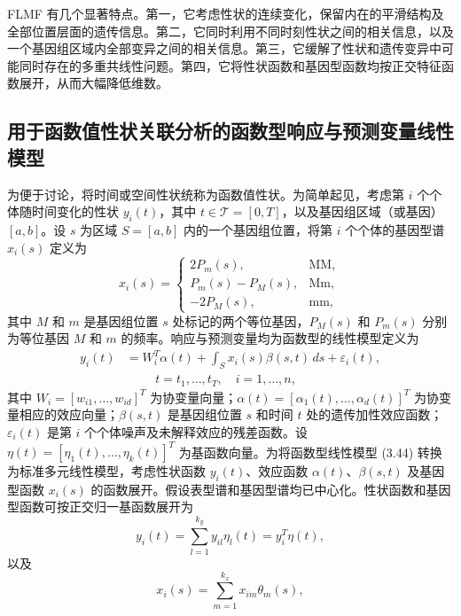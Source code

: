FLMF 有几个显著特点。第一，它考虑性状的连续变化，保留内在的平滑结构及全部位置层面的遗传信息。第二，它同时利用不同时刻性状之间的相关信息，以及一个基因组区域内全部变异之间的相关信息。第三，它缓解了性状和遗传变异中可能同时存在的多重共线性问题。第四，它将性状函数和基因型函数均按正交特征函数展开，从而大幅降低维数。

\subsection{用于函数值性状关联分析的函数型响应与预测变量线性模型}

为便于讨论，将时间或空间性状统称为函数值性状。为简单起见，考虑第 $i$ 个个体随时间变化的性状 $y_i(t)$，其中 $t\in\mathcal T=[0,T]$，以及基因组区域（或基因）$[a,b]$。设 $s$ 为区域 $S=[a,b]$ 内的一个基因组位置，将第 $i$ 个个体的基因型谱 $x_i(s)$ 定义为
\[
x_i(s)=
\begin{cases}
2P_m(s),&\mathrm{MM},\\
P_m(s)-P_M(s),&\mathrm{Mm},\\
-2P_M(s),&\mathrm{mm},
\end{cases}
\]
其中 $M$ 和 $m$ 是基因组位置 $s$ 处标记的两个等位基因，$P_M(s)$ 和 $P_m(s)$ 分别为等位基因 $M$ 和 $m$ 的频率。响应与预测变量均为函数型的线性模型定义为
\begin{equation}
\begin{aligned}
y_i(t)&=W_i^T\alpha(t)+\int_S x_i(s)\beta(s,t)\,ds+\varepsilon_i(t),\\
&\hspace{1cm}t=t_1,\ldots,t_T,\quad i=1,\ldots,n,
\end{aligned}
\tag{3.44}
\end{equation}
其中 $W_i=[w_{i1},\ldots,w_{id}]^T$ 为协变量向量；$\alpha(t)=[\alpha_1(t),\ldots,\alpha_d(t)]^T$ 为协变量相应的效应向量；$\beta(s,t)$ 是基因组位置 $s$ 和时间 $t$ 处的遗传加性效应函数；$\varepsilon_i(t)$ 是第 $i$ 个个体噪声及未解释效应的残差函数。设 $\eta(t)=[\eta_1(t),\ldots,\eta_k(t)]^T$ 为基函数向量。为将函数型线性模型 (3.44) 转换为标准多元线性模型，考虑性状函数 $y_i(t)$、效应函数 $\alpha(t)$、$\beta(s,t)$ 及基因型函数 $x_i(s)$ 的函数展开。假设表型谱和基因型谱均已中心化。性状函数和基因型函数可按正交归一基函数展开为
\begin{equation}
y_i(t)=\sum_{l=1}^{k_y}y_{il}\eta_l(t)=y_i^T\eta(t),
\tag{3.45}
\end{equation}
以及
\begin{equation}
x_i(s)=\sum_{m=1}^{k_x}x_{im}\theta_m(s),
\tag{3.46}
\end{equation}
